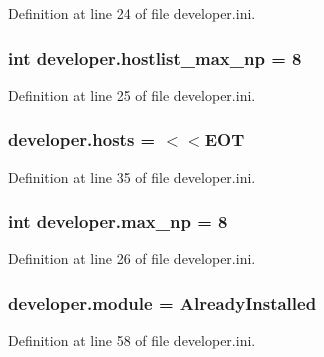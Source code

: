 Definition at line 24 of file developer.\-ini.

\hypertarget{namespacedeveloper_a13c279bb81fd7dcabc6f5d521e479aa3}{
\subsubsection[{hostlist\-\_\-max\-\_\-np}]{\setlength{\rightskip}{0pt plus 5cm}int developer.\-hostlist\-\_\-max\-\_\-np = 8}}\label{namespacedeveloper_a13c279bb81fd7dcabc6f5d521e479aa3}


Definition at line 25 of file developer.\-ini.

\hypertarget{namespacedeveloper_a306d0b8e053855bb90f9a1e892fb95de}{
\subsubsection[{hosts}]{\setlength{\rightskip}{0pt plus 5cm}developer.\-hosts = $<$$<$E\-O\-T}}\label{namespacedeveloper_a306d0b8e053855bb90f9a1e892fb95de}


Definition at line 35 of file developer.\-ini.

\hypertarget{namespacedeveloper_ae3c0c16810bf766d5d343a96a25ed5f5}{
\subsubsection[{max\-\_\-np}]{\setlength{\rightskip}{0pt plus 5cm}int developer.\-max\-\_\-np = 8}}\label{namespacedeveloper_ae3c0c16810bf766d5d343a96a25ed5f5}


Definition at line 26 of file developer.\-ini.

\hypertarget{namespacedeveloper_a2b87fdf0293735256891d21cd3fdf1c4}{
\subsubsection[{module}]{\setlength{\rightskip}{0pt plus 5cm}developer.\-module = Already\-Installed}}\label{namespacedeveloper_a2b87fdf0293735256891d21cd3fdf1c4}


Definition at line 58 of file developer.\-ini.

